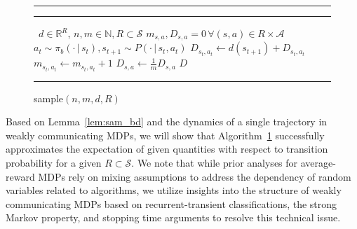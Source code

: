 \documentclass{article}
\theoremstyle{definition}
\theoremstyle{remark}
\newcommand{\real}{\mathbb{R}}
\newcommand{\cA}{\mathcal{A}}
\newcommand{\cS}{\mathcal{S}}
\begin{document}
\begin{figure}
\vspace{-.14in}
\captionsetup{type=algorithm}
\hrule
\vspace{2pt}
\begin{minipage}{0.46\textwidth}
 \caption{\mbox{\sc sample}$( n,  m, d, R)$}
   \label{alg:sam_1}
\vspace{-.1in}
\hrule

\begin{algorithmic}
  \ $d \in \real^{R}$, $n, m \in \mathbb{N}, R \subset \cS$
   $m_{s,a}, D_{s,a} =0 \, \forall (s,a) \in R \times \cA $
     \State $a_{t} \sim \pi_b(\cdot \,|\, s_{t}), s_{t+1} \sim P(\cdot \,|\, s_t,a_t)$
        \If{$s_t,a_t \in R\times \cA, m_{s_t,a_t} <m$}
   \State $D_{s_t,a_t} \gets d(s_{t+1}) + D_{s_t,a_t}$
     \State $m_{s_t,a_t} \gets m_{s_t,a_t}+1$
   \EndIf
  \EndFor
  \For{$(s,a) \in R \times \cA$}
  \State $D_{s,a} \gets \frac{1}{m}D_{s,a} $
  \EndFor
  $D$
\end{algorithmic}
\hrule
\end{minipage}
\end{figure}
Based on Lemma~\ref{lem:sam_bd} and the dynamics of a single trajectory in weakly communicating MDPs, we will show that Algorithm~\ref{alg:sam_1} successfully approximates the expectation of given quantities with respect to transition probability for a given $R \subset \cS$. We note that while prior analyses for average-reward MDPs \cite{wei2020model,bai2024regret} rely on mixing assumptions to  address the dependency of random variables related to algorithms, we utilize insights into the structure of weakly communicating MDPs based on recurrent-transient classifications, the strong Markov property, and stopping time arguments to resolve this technical issue. 
\end{document}
